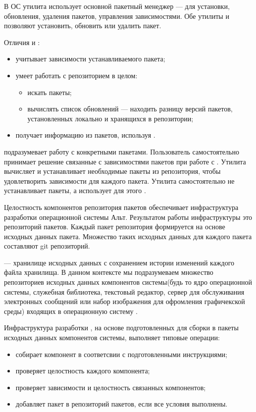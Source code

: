В ОС  утилита  использует основной пакетный менеджер  --- 
 для установки, обновления, удаления пакетов, управления зависимостями. Обе
утилиты  и  позволяют установить, обновить или удалить пакет.

Отличия  и :
\begin{itemize}
	\item {} учитывает зависимости устанавливаемого пакета;
	\item {} умеет работать с репозиторием в целом:
	\begin{itemize}
		\item искать пакеты;
		\item вычислять список обновлений --- находить разницу версий пакетов, 
			установленных локально и хранящихся в репозитории;
	\end{itemize}
	\item {} получает информацию из пакетов, используя .
\end{itemize}

 подразумевает работу с конкретными пакетами. Пользователь самостоятельно
принимает решение связанные с зависимостями пакетов  при работе с . Утилита 
вычисляет и устанавливает необходимые пакеты из репозитория, чтобы удовлетворить зависимости для
каждого  пакета. Утилита  самостоятельно не устанавливает пакеты, а использует для этого .

	
Целостность компонентов репозитория пакетов обеспечивает инфраструктура разработки операционной системы Альт.
Результатом работы инфраструктуры это репозиторий пакетов. Каждый пакет репозитория формируется на
основе исходных данных пакета. Множество таких исходных данных для каждого пакета составляют git репозиторий.

 --- хранилище исходных данных с сохранением истории изменений каждого файла
хранилища. В данном контексте мы подразумеваем множество репозиториев исходных данных компонентов
системы(будь то ядро операционной системы, служебная библиотека, текстовый редактор, сервер для обслуживания
электронных сообщений или набор изображения для офромления графичекской среды) входящих в операционную
систему .

Инфраструктура разработки , на основе подготовленных для сборки в пакеты исходных данных компонентов
системы, выполняет типовые операции:
\begin{itemize}
	\item собирает компонент в соответсвии с подготовленными инструкциями;
	\item проверяет целостность каждого компонента;
	\item проверяет зависимости и целостность связанных компонентов;
	\item добавляет пакет в репозиторий пакетов, если все условия выполнены.
\end{itemize}

